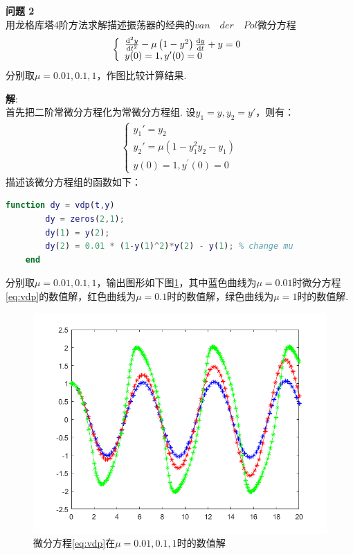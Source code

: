 \documentclass[UTF8]{ctexart}
\newenvironment{problem}[2][问题]
{\begin{mdframed}[backgroundcolor=gray!20] \textbf{#1 #2} \\}
	{\end{mdframed}}
\begin{document}
\begin{problem}{2}
	用龙格库塔4阶方法求解描述振荡器的经典的$van\quad der\quad Pol$微分方程
	\begin{align}
		\left\{\begin{array}{l}
		\frac{\mathrm{d}^{2} y}{\mathrm{d} t^{2}}-\mu\left(1-y^{2}\right) \frac{\mathrm{d} y}{\mathrm{d} t}+y=0 \\
		y(0)=1, y^{\prime}(0)=0
		\end{array}\right.\notag
	\end{align}
	分别取$μ = 0.01, 0.1, 1$，作图比较计算结果.
\end{problem}
\textbf{解}:\\
首先把二阶常微分方程化为常微分方程组. 设$y_1=y, y_2=y'$，则有：
\begin{align}
	\left\{\begin{array}{l}
		y_{1}'=y_2 \\
		y_{2}'=\mu (1-y^{2}_{1}y_{2}-y_{1}) \\
		y(0)=1, y^{\prime}(0)=0
	\end{array}\right.\label{eq:vdp}
\end{align}
描述该微分方程组的函数如下：
\begin{lstlisting}[language=matlab]
	function dy = vdp(t,y)
		dy = zeros(2,1);
		dy(1) = y(2);
		dy(2) = 0.01 * (1-y(1)^2)*y(2) - y(1); % change mu
	end
\end{lstlisting}
分别取$\mu = 0.01, 0.1, 1$，输出图形如下图\ref{fig:p2}，其中蓝色曲线为$\mu = 0.01$时微分方程\ref{eq:vdp}的数值解，红色曲线为$\mu = 0.1$时的数值解，绿色曲线为$\mu = 1$时的数值解.\\
\begin{figure}[H]
	\begin{center}
		\includegraphics[width=0.7\columnwidth]{figures/p2.png}
		\caption{微分方程\ref{eq:vdp}在$\mu = 0.01, 0.1, 1$时的数值解}
		\label{fig:p2}
	\end{center}
\end{figure}
\end{document}
